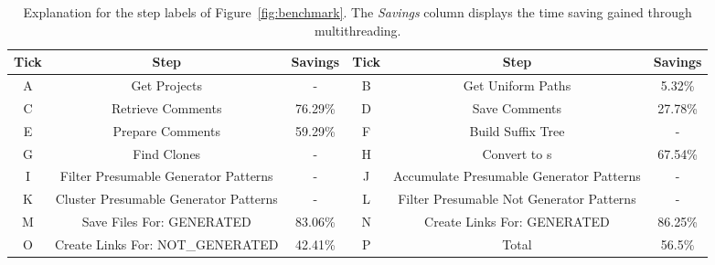 \setlength{\extrarowheight}{.0em}
\begin{table}
	\caption{Explanation for the step labels of Figure~\ref{fig:benchmark}. The \textit{Savings} column displays the time saving gained through multithreading.}
	\label{table:tickLabels}
		\begin{tabularx}{\textwidth}{c|C|c||c|C|c}
			\textbf{Tick} & \textbf{Step} & \textbf{Savings} & \textbf{Tick} & \textbf{Step} & \textbf{Savings}\\
			\hline
			A & Get Projects & - & B & Get Uniform Paths & 5.32\% \\
			C & Retrieve Comments & 76.29\% & D & Save Comments & 27.78\% \\
			E & Prepare Comments & 59.29\% &F& Build Suffix Tree & - \\
			G& Find Clones & - & H & Convert to s & 67.54\%\\
			I&Filter Presumable Generator Patterns & - &J&Accumulate Presumable Generator Patterns & -\\
			K&Cluster Presumable Generator Patterns & - &L&Filter Presumable Not Generator Patterns & -\\
			M& Save Files For: GENERATED& 83.06\% &N&Create Links For: GENERATED & 86.25\%\\
			O& Create Links For: NOT\_GENERATED& 42.41\% & P & Total & 56.5\%
		\end{tabularx}
\end{table}
\setlength{\extrarowheight}{0em}